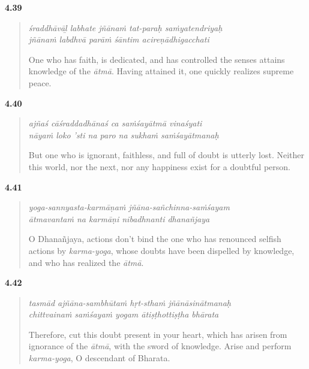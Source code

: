 \par\noindent\textbf{4.39}\par
\begin{verse}
\textit{śraddhāvāḻ labhate jñānaṁ tat-paraḥ saṁyatendriyaḥ} \\
\textit{jñānaṁ labdhvā parāṁ śāntim acireṇādhigacchati}

\noindent One who has faith, is dedicated, and has controlled the senses attains knowledge of the \textit{ātmā}. Having attained it, one quickly realizes supreme peace.
\end{verse}
\par



\par\noindent\textbf{4.40}\par
\begin{verse}
\textit{ajñaś cāśraddadhānaś ca saṁśayātmā vinaśyati} \\
\textit{nāyaṁ loko ’sti na paro na sukhaṁ saṁśayātmanaḥ}

\noindent But one who is ignorant, faithless, and full of doubt is utterly lost. Neither this world, nor the next, nor any happiness exist for a doubtful person.
\end{verse}
\par



\par\noindent\textbf{4.41}\par
\begin{verse}
\textit{yoga-sannyasta-karmāṇaṁ jñāna-sañchinna-saṁśayam} \\
\textit{ātmavantaṁ na karmāṇi nibadhnanti dhanañjaya}

\noindent O Dhanañjaya, actions don't bind the one who has renounced selfish actions by \textit{karma-yoga}, whose doubts have been dispelled by knowledge, and who has realized the \textit{ātmā}.
\end{verse}
\par



\par\noindent\textbf{4.42}\par
\begin{verse}
\textit{tasmād ajñāna-sambhūtaṁ hṛt-sthaṁ jñānāsinātmanaḥ} \\
\textit{chittvainaṁ saṁśayaṁ yogam ātiṣṭhottiṣṭha bhārata}

\noindent Therefore, cut this doubt present in your heart, which has arisen from ignorance of the \textit{ātmā}, with the sword of knowledge. Arise and perform \textit{karma-yoga}, O descendant of Bharata.
\end{verse}
\par


